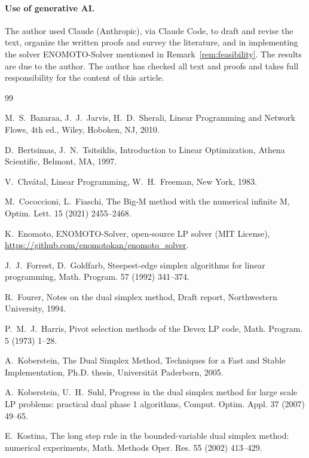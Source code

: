 \documentclass[11pt,a4paper]{article}
\theoremstyle{plain}
\theoremstyle{definition}
\theoremstyle{remark}
\begin{document}
\paragraph{Use of generative AI.} The author used Claude (Anthropic), via Claude Code, to draft and revise the text, organize the written proofs and survey the literature, and in implementing the solver ENOMOTO-Solver mentioned in Remark~\ref{rem:feasibility}. The results are due to the author. The author has checked all text and proofs and takes full responsibility for the content of this article.
\begin{thebibliography}{99}

M.~S.~Bazaraa, J.~J.~Jarvis, H.~D.~Sherali,
Linear Programming and Network Flows, 4th ed.,
Wiley, Hoboken, NJ, 2010.

D.~Bertsimas, J.~N.~Tsitsiklis,
Introduction to Linear Optimization,
Athena Scientific, Belmont, MA, 1997.

V.~Chv\'atal,
Linear Programming,
W.~H.~Freeman, New York, 1983.

M.~Cococcioni, L.~Fiaschi,
The Big-M method with the numerical infinite M,
Optim. Lett. 15 (2021) 2455--2468.

K.~Enomoto,
ENOMOTO-Solver, open-source LP solver (MIT License),
\url{https://github.com/enomotokan/enomoto_solver}.

J.~J.~Forrest, D.~Goldfarb,
Steepest-edge simplex algorithms for linear programming,
Math. Program. 57 (1992) 341--374.

R.~Fourer,
Notes on the dual simplex method,
Draft report, Northwestern University, 1994.

P.~M.~J.~Harris,
Pivot selection methods of the Devex LP code,
Math. Program. 5 (1973) 1--28.

A.~Koberstein,
The Dual Simplex Method, Techniques for a Fast and Stable Implementation,
Ph.D. thesis, Universit\"at Paderborn, 2005.

A.~Koberstein, U.~H.~Suhl,
Progress in the dual simplex method for large scale LP problems: practical dual phase 1 algorithms,
Comput. Optim. Appl. 37 (2007) 49--65.

E.~Kostina,
The long step rule in the bounded-variable dual simplex method: numerical experiments,
Math. Methods Oper. Res. 55 (2002) 413--429.


\end{thebibliography}
\end{document}
